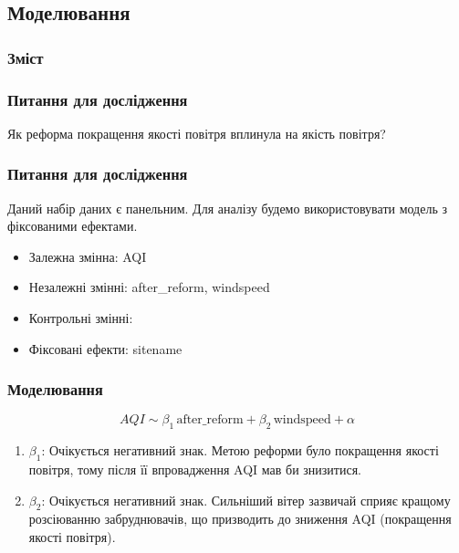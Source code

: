 ﻿\documentclass{beamer}
\begin{document}
% 

\begin{frame}
  \section{Моделювання}

  \frametitle{Зміст}
  \tableofcontents[currentsection]
\end{frame}

\begin{frame}
  \frametitle{Питання для дослідження}
  Як реформа покращення якості повітря вплинула на якість повітря?

  
\end{frame}

\begin{frame}
  \frametitle{Питання для дослідження}

  Даний набір даних є панельним. Для аналізу будемо використовувати модель з фіксованими ефектами.

  \begin{itemize}
    \item Залежна змінна: AQI
    \item Незалежні змінні: after\_reform\footnotemark, windspeed
    \item Контрольні змінні:  
    \item Фіксовані ефекти: sitename
  \end{itemize}

\end{frame}

%    

\begin{frame}
  \frametitle{Моделювання}

   $$AQI \sim \beta_1 \, \text{after\_reform} + \beta_2 \, \text{windspeed} + \alpha $$

  \begin{enumerate}
    \item $\beta_1$: Очікується негативний знак. 
    Метою реформи було покращення якості повітря,
    тому після її впровадження AQI мав би знизитися.

    \item $\beta_2$: Очікується негативний знак. 
    Сильніший вітер зазвичай сприяє кращому розсіюванню забруднювачів, 
    що призводить до зниження AQI (покращення якості повітря).
  \end{enumerate}
\end{frame}
\end{document}
